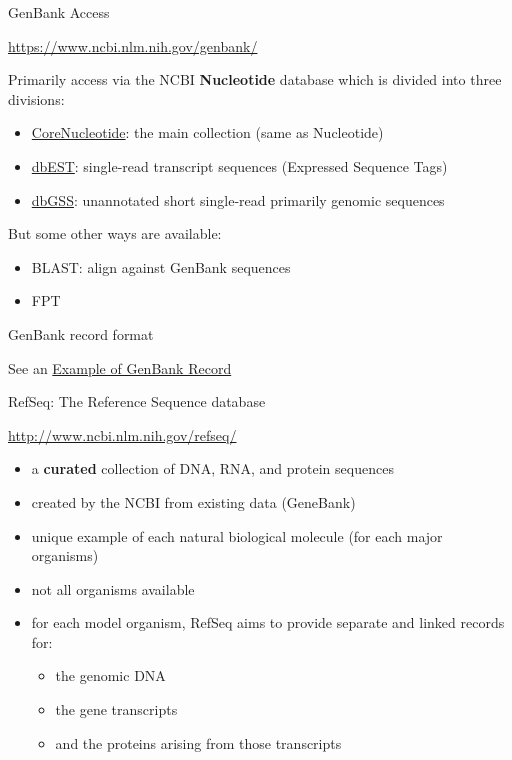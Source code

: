 \begin{frame}{GenBank Access}

\url{https://www.ncbi.nlm.nih.gov/genbank/}

Primarily access via the NCBI \textbf{Nucleotide} database which is
divided into three divisions:

\begin{itemize}
\itemsep1pt\parskip0pt
\item
  \href{https://www.ncbi.nlm.nih.gov/nuccore/}{CoreNucleotide}: the main
  collection (same as Nucleotide)
\item
  \href{https://www.ncbi.nlm.nih.gov/nucest/}{dbEST}: single-read
  transcript sequences (Expressed Sequence Tags)
\item
  \href{https://www.ncbi.nlm.nih.gov/nucgss/}{dbGSS}: unannotated short
  single-read primarily genomic sequences
\end{itemize}

But some other ways are available:

\begin{itemize}
\itemsep1pt\parskip0pt
\item
  BLAST: align against GenBank sequences
\item
  FPT
\end{itemize}

\end{frame}

\begin{frame}{GenBank record format}

See an
\href{http://www.ncbi.nlm.nih.gov/Sitemap/samplerecord.html}{Example of
GenBank Record}

\end{frame}

\begin{frame}{RefSeq: The Reference Sequence database}

\url{http://www.ncbi.nlm.nih.gov/refseq/}

\begin{itemize}
\itemsep1pt\parskip0pt
\item
  a \textbf{curated} collection of DNA, RNA, and protein sequences
\item
  created by the NCBI from existing data (GeneBank)
\item
  unique example of each natural biological molecule (for each major
  organisms)
\item
  not all organisms available
\item
  for each model organism, RefSeq aims to provide separate and linked
  records for:

  \begin{itemize}
  \itemsep1pt\parskip0pt
  \item
    the genomic DNA
  \item
    the gene transcripts
  \item
    and the proteins arising from those transcripts
  \end{itemize}
\end{itemize}

\end{frame}


